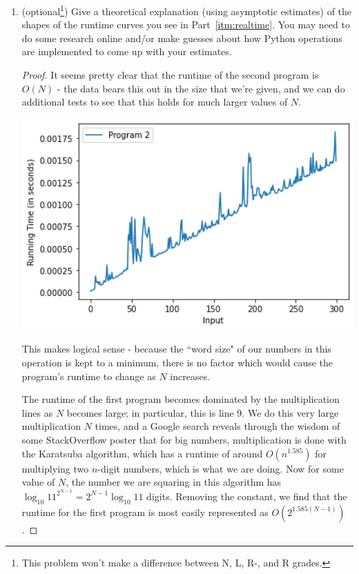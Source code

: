 \documentclass[11pt]{article}
\begin{document}
\begin{enumerate}
\begin{enumerate}
    \item (optional\footnote{This problem won't make a difference between N, L, R-, and R grades.}) Give a theoretical explanation (using asymptotic estimates) of the shapes of the runtime curves you see in Part~\ref{itm:realtime}. You may need to do some research online and/or make guesses about how Python operations are implemented to come up with your estimates. 
    
\begin{proof}
It seems pretty clear that the runtime of the second program is $O(N)$ - the data bears this out in the size that we're given, and we can do additional tests to see that this holds for much larger values of $N$. 

\includegraphics[width=5in]{2-3}

This makes logical sense - because the ``word size" of our numbers in this operation is kept to a minimum, there is no factor which would cause the program's runtime to change as $N$ increases.

The runtime of the first program becomes dominated by the multiplication lines as $N$ becomes large; in particular, this is line 9. We do this very large multiplication $N$ times, and a Google search reveals through the wisdom of some StackOverflow poster that for big numbers, multiplication is done with the Karatsuba algorithm, which has a runtime of around $O(n^{1.585})$ for multiplying two $n$-digit numbers, which is what we are doing. Now for some value of $N$, the number we are squaring in this algorithm has $\log_{10} 11^{2^{N - 1}} = 2^{N - 1} \log_{10} 11$ digits. Removing the constant, we find that the runtime for the first program is most easily represented as $O(2^{1.585(N - 1)})$.
\end{proof}


\end{enumerate}
\end{enumerate}
\end{document}
